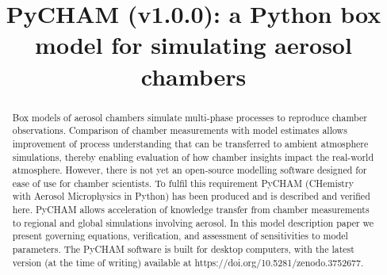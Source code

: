 \documentclass[gmd, manuscript]{copernicus}
\begin{document}
\title{PyCHAM (v1.0.0): a Python box model for simulating aerosol chambers}















\received{}
\pubdiscuss{} %
\revised{}
\accepted{}
\published{}




\maketitle



\begin{abstract}
Box models of aerosol chambers simulate multi-phase processes to reproduce chamber observations.  Comparison of chamber measurements with model estimates allows improvement of process understanding that can be transferred to ambient atmosphere simulations, thereby enabling evaluation of how chamber insights impact the real-world atmosphere.  However, there is not yet an open-source modelling software designed for ease of use for chamber scientists.  To fulfil this requirement PyCHAM (CHemistry with Aerosol Microphysics in Python) has been produced and is described and verified here.  PyCHAM allows acceleration of knowledge transfer from chamber measurements to regional and global simulations involving aerosol.  In this model description paper we present governing equations, verification, and assessment of sensitivities to model parameters.  The PyCHAM software is built for desktop computers, with the latest version (at the time of writing) available at https://doi.org/10.5281/zenodo.3752677.

\end{abstract}
\end{document}
